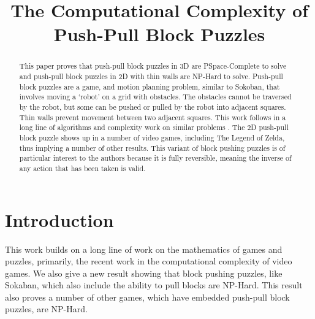 \documentclass[11pt]{article}
\begin{document}
\title{The Computational Complexity of Push-Pull Block Puzzles}


\begin{abstract}
This paper proves that push-pull block puzzles in 3D are PSpace-Complete to solve and push-pull block puzzles in 2D with thin walls are NP-Hard to solve. Push-pull block puzzles are a game, and motion planning problem, similar to Sokoban, that involves moving a `robot' on a grid with obstacles. The obstacles cannot be traversed by the robot, but some can be pushed or pulled by the robot into adjacent squares. Thin walls prevent movement between two adjacent squares. This work follows in a long line of algorithms and complexity work on similar problems \cite{PushPull91}\cite{Push100}\cite{Push*00}\cite{PushPushk04}\cite{non-crossing01}\cite{DO92}\cite{Push2F02}\cite{Sokoban98}\cite{DZ96}\cite{Pull10}. The 2D push-pull block puzzle shows up in a number of video games, including The Legend of Zelda, thus implying a number of other results. This variant of block pushing puzzles is of particular interest to the authors because it is fully reversible, meaning the inverse of any action that has been taken is valid.
\end{abstract}

\section{Introduction} 

This work builds on a long line of work on the mathematics of games and puzzles, primarily, the recent work in the computational complexity of video games.  We also give a new result showing that block pushing puzzles, like Sokaban, which also include the ability to pull blocks are NP-Hard. This result also proves a number of other games, which have embedded push-pull block puzzles, are NP-Hard.
\end{document}
